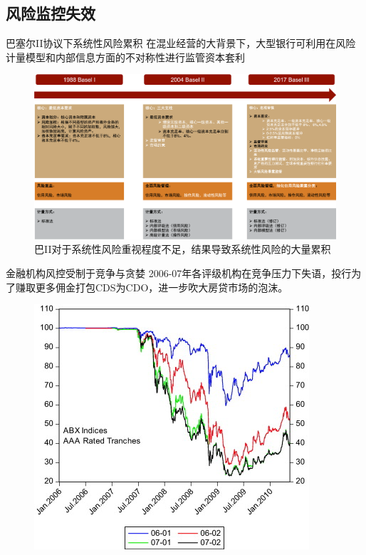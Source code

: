 \subsection{风险监控失效}\label{sec:4}
\begin{frame}{巴塞尔II协议下系统性风险累积}
    在混业经营的大背景下，大型银行可利用在风险计量模型和内部信息方面的不对称性进行监管资本套利
    \begin{figure}[H]
        \includegraphics[width=0.8\linewidth]{img/basel.png}
        \caption{巴II对于系统性风险重视程度不足，结果导致系统性风险的大量累积}
    \end{figure}
\end{frame}

\begin{frame}{金融机构风控受制于竞争与贪婪}
    2006-07年各评级机构在竞争压力下失语，投行为了赚取更多佣金打包CDS为CDO，进一步吹大房贷市场的泡沫。
    \begin{figure}[H]
        \includegraphics[width=0.7\linewidth]{img/abx.jpg}
    \end{figure}
\end{frame}

